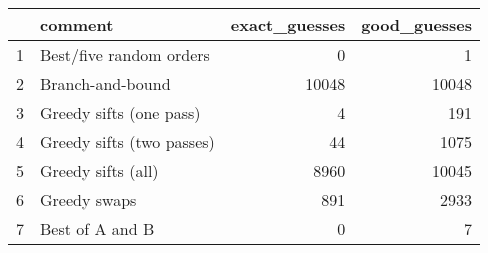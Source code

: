 \begin{table}[ht]
\centering
\begin{tabular}{rlrr}
  \hline
 & comment & exact\_guesses & good\_guesses \\ 
  \hline
1 & Best/five random orders &   0 &   1 \\ 
  2 & Branch-and-bound & 10048 & 10048 \\ 
  3 & Greedy sifts (one pass) &   4 & 191 \\ 
  4 & Greedy sifts (two passes) &  44 & 1075 \\ 
  5 & Greedy sifts (all) & 8960 & 10045 \\ 
  6 & Greedy swaps & 891 & 2933 \\ 
  7 & Best of A and B &   0 &   7 \\ 
   \hline
\end{tabular}
\end{table}
